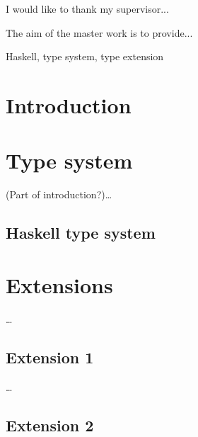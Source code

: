 \documentclass[11pt,oneside,draft]{fithesis2}
\begin{document}
\FrontMatter
\ThesisTitlePage

\begin{ThesisDeclaration}
\DeclarationText
\AdvisorName
\end{ThesisDeclaration}

\begin{ThesisThanks}
I would like to thank my supervisor...
\end{ThesisThanks}

\begin{ThesisAbstract}
The aim of the master work is to provide...
\end{ThesisAbstract}

\begin{ThesisKeyWords}
Haskell, type system, type extension
\end{ThesisKeyWords}

\tableofcontents

\MainMatter

\chapter{Introduction}

\cite{barendregt:1992:lambda}

\chapter{Type system}

(Part of introduction?)\dots

\section{Haskell type system}

\cite{haskell2010}

\chapter{Extensions}

\dots

\section{Extension 1}

\dots

\section{Extension 2}
\end{document}
